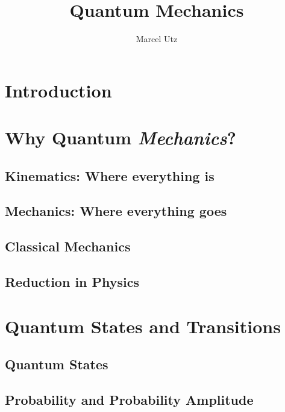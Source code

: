 \documentclass{UtzLecture}
\title{Quantum Mechanics}
\author{Marcel Utz}
\begin{document}
\maketitle

\chapter{Introduction}

\chapter{Why Quantum \textit{Mechanics}\/?}
\section{Kinematics: Where everything is}
\section{Mechanics: Where everything goes}
\section{Classical Mechanics}
\section{Reduction in Physics}

\chapter{Quantum States and Transitions}
\section{Quantum States}
\section{Probability and Probability Amplitude}
\end{document}
